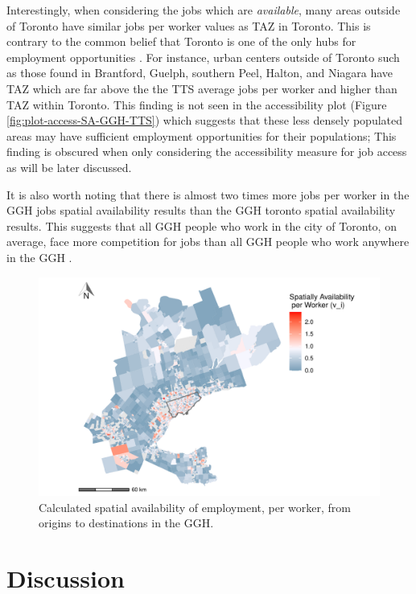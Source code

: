 \documentclass[]{elsarticle} %
\begin{document}
Interestingly, when considering the jobs which are \emph{available},
many areas outside of Toronto have similar jobs per worker values as TAZ
in Toronto. This is contrary to the common belief that Toronto is one of
the only hubs for employment opportunities . For instance, urban centers
outside of Toronto such as those found in Brantford, Guelph, southern
Peel, Halton, and Niagara have TAZ which are far above the the TTS
average jobs per worker and higher than TAZ within Toronto. This finding
is not seen in the accessibility plot (Figure
\ref{fig:plot-access-SA-GGH-TTS}) which suggests that these less densely
populated areas may have sufficient employment opportunities for their
populations; This finding is obscured when only considering the
accessibility measure for job access as will be later discussed.

It is also worth noting that there is almost two times more jobs per
worker in the GGH jobs spatial availability results than the GGH toronto
spatial availability results. This suggests that all GGH people who work
in the city of Toronto, on average, face more competition for jobs than
all GGH people who work anywhere in the GGH .

\begin{figure}
\includegraphics[width=1\linewidth]{Spatial-Availability_files/figure-latex/plot-avail-GGH-TTS-per-worker-1} \caption{\label{fig:plot-avail-GGH-TTS-per-worker}Calculated spatial availability of employment, per worker, from origins to destinations in the GGH.}\label{fig:plot-avail-GGH-TTS-per-worker}
\end{figure}
\newpage

\hypertarget{discussion}{%
\section{Discussion}\label{discussion}}
\end{document}
